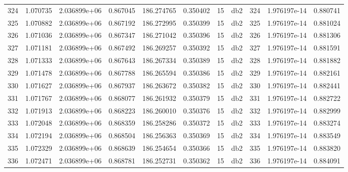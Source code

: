 \begin{tabular}{lrrrrrrlrrr}
324  &    1.070735 &        2.036899e+06 &  0.867045 &              186.274765 &    0.350402 &      15 &          db2 &    324 &   1.976197e-14 &      0.880741 \\
325  &    1.070882 &        2.036899e+06 &  0.867192 &              186.272995 &    0.350399 &      15 &          db2 &    325 &   1.976197e-14 &      0.881024 \\
326  &    1.071036 &        2.036899e+06 &  0.867347 &              186.271042 &    0.350396 &      15 &          db2 &    326 &   1.976197e-14 &      0.881306 \\
327  &    1.071181 &        2.036899e+06 &  0.867492 &              186.269257 &    0.350392 &      15 &          db2 &    327 &   1.976197e-14 &      0.881591 \\
328  &    1.071333 &        2.036899e+06 &  0.867643 &              186.267334 &    0.350389 &      15 &          db2 &    328 &   1.976197e-14 &      0.881882 \\
329  &    1.071478 &        2.036899e+06 &  0.867788 &              186.265594 &    0.350386 &      15 &          db2 &    329 &   1.976197e-14 &      0.882161 \\
330  &    1.071627 &        2.036899e+06 &  0.867937 &              186.263672 &    0.350382 &      15 &          db2 &    330 &   1.976197e-14 &      0.882441 \\
331  &    1.071767 &        2.036899e+06 &  0.868077 &              186.261932 &    0.350379 &      15 &          db2 &    331 &   1.976197e-14 &      0.882722 \\
332  &    1.071913 &        2.036899e+06 &  0.868223 &              186.260010 &    0.350376 &      15 &          db2 &    332 &   1.976197e-14 &      0.882999 \\
333  &    1.072048 &        2.036899e+06 &  0.868359 &              186.258286 &    0.350372 &      15 &          db2 &    333 &   1.976197e-14 &      0.883274 \\
334  &    1.072194 &        2.036899e+06 &  0.868504 &              186.256363 &    0.350369 &      15 &          db2 &    334 &   1.976197e-14 &      0.883549 \\
335  &    1.072329 &        2.036899e+06 &  0.868639 &              186.254654 &    0.350366 &      15 &          db2 &    335 &   1.976197e-14 &      0.883820 \\
336  &    1.072471 &        2.036899e+06 &  0.868781 &              186.252731 &    0.350362 &      15 &          db2 &    336 &   1.976197e-14 &      0.884091 \\

\end{tabular}

